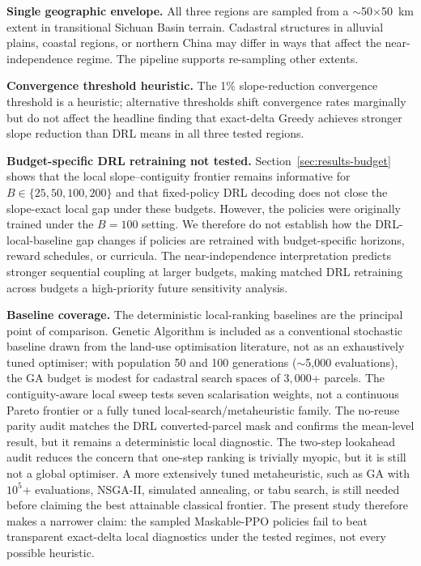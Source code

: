 \documentclass[]{interact}
\theoremstyle{plain}
\begin{document}
\textbf{Single geographic envelope.} All three regions are sampled from a $\sim$50$\times$50~km extent in transitional Sichuan Basin terrain. Cadastral structures in alluvial plains, coastal regions, or northern China may differ in ways that affect the near-independence regime. The pipeline supports re-sampling other extents.

\textbf{Convergence threshold heuristic.} The 1\% slope-reduction convergence threshold is a heuristic; alternative thresholds shift convergence rates marginally but do not affect the headline finding that exact-delta Greedy achieves stronger slope reduction than DRL means in all three tested regions.

\textbf{Budget-specific DRL retraining not tested.} Section~\ref{sec:results-budget} shows that the local slope--contiguity frontier remains informative for $B\in\{25,50,100,200\}$ and that fixed-policy DRL decoding does not close the slope-exact local gap under these budgets. However, the policies were originally trained under the $B=100$ setting. We therefore do not establish how the DRL-local-baseline gap changes if policies are retrained with budget-specific horizons, reward schedules, or curricula. The near-independence interpretation predicts stronger sequential coupling at larger budgets, making matched DRL retraining across budgets a high-priority future sensitivity analysis.

\textbf{Baseline coverage.} The deterministic local-ranking baselines are the principal point of comparison. Genetic Algorithm is included as a conventional stochastic baseline drawn from the land-use optimisation literature, not as an exhaustively tuned optimiser; with population 50 and 100 generations ($\sim$5{,}000 evaluations), the GA budget is modest for cadastral search spaces of $3{,}000$+ parcels. The contiguity-aware local sweep tests seven scalarisation weights, not a continuous Pareto frontier or a fully tuned local-search/metaheuristic family. The no-reuse parity audit matches the DRL converted-parcel mask and confirms the mean-level result, but it remains a deterministic local diagnostic. The two-step lookahead audit reduces the concern that one-step ranking is trivially myopic, but it is still not a global optimiser. A more extensively tuned metaheuristic, such as GA with $10^5$+ evaluations, NSGA-II, simulated annealing, or tabu search, is still needed before claiming the best attainable classical frontier. The present study therefore makes a narrower claim: the sampled Maskable-PPO policies fail to beat transparent exact-delta local diagnostics under the tested regimes, not every possible heuristic.
\end{document}
